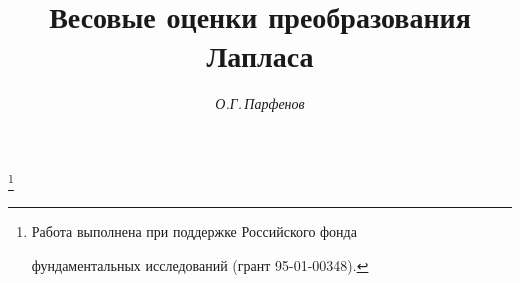 




 





\newcommand{\Ker}{\operatorname{Ker}}


\newcommand{\tts}[1]{}










\setcounter{page}{50}












\author{\it О.Г.\,Парфенов}




\title{Весовые оценки преобразования Лапласа}





\thanks{Работа выполнена при поддержке Российского фонда


фундаментальных исследований (грант 95-01-00348).}


\date{}







\pagestyle{plain} %













